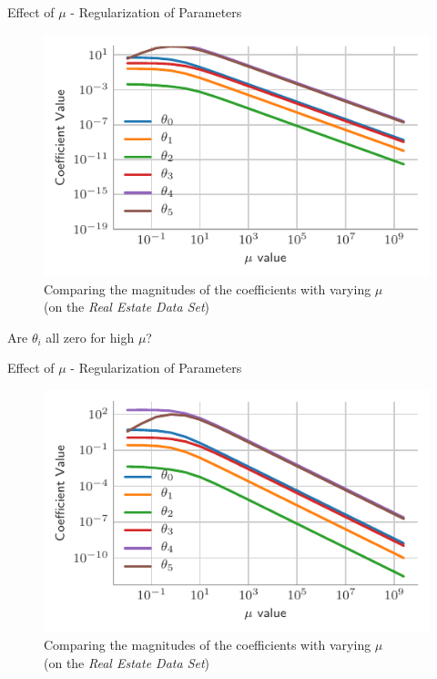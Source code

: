 \documentclass{beamer}
\begin{document}

\begin{frame}{Effect of $\mu$ - Regularization of Parameters}
\vspace{0.4cm}
\begin{figure}\includegraphics[width=0.8\linewidth]{ridge/rid_reg-without-lim.pdf}\caption{Comparing the magnitudes of the coefficients with varying $\mu$\\(on the \emph{Real Estate Data Set})}
\end{figure}
\pause Are $\theta_{i}$ all zero for high $\mu$?
\end{frame}

\begin{frame}{Effect of $\mu$ - Regularization of Parameters}
\vspace{0.4cm}
\begin{figure}\includegraphics[width=0.8\linewidth]{ridge/rid_reg-with-lim.pdf}\caption{Comparing the magnitudes of the coefficients with varying $\mu$\\(on the \emph{Real Estate Data Set})}
\end{figure}
\end{frame}
\end{document}
